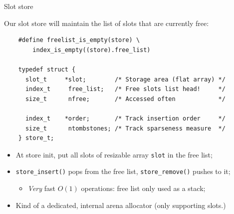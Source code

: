 \begin{frame}[fragile]{Slot store}

  Our slot store will maintain the list of slots that are currently free:
  \begin{lstlisting}
    #define freelist_is_empty(store) \
        index_is_empty((store).free_list)
    
    typedef struct {
      slot_t     *slot;        /* Storage area (flat array) */
      index_t     free_list;   /* Free slots list head!     */
      size_t      nfree;       /* Accessed often            */

      index_t    *order;       /* Track insertion order     */
      size_t      ntombstones; /* Track sparseness measure  */
    } store_t;
  \end{lstlisting}

  \begin{itemize}
  \item At store init, put all slots of resizable array \lstinline{slot} in the free list;
  \item \lstinline{store_insert()} pops from the free list, \lstinline{store_remove()} pushes to it;
    \begin{itemize}
    \item {\em Very} fast $O(1)$ operations: free list only used as a stack;
    \end{itemize}
  \item Kind of a dedicated, internal arena allocator (only supporting slots.)
  
  \end{itemize}
    
\end{frame}



